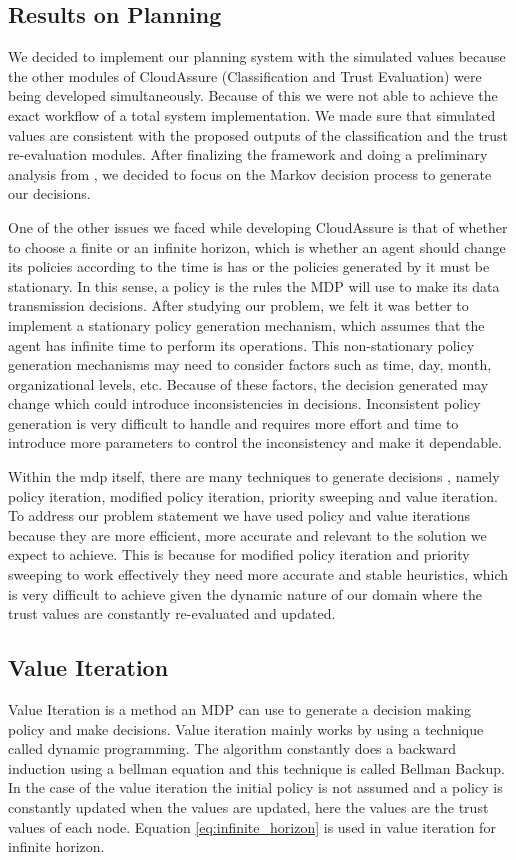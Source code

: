 \subsection{Results on Planning}
We decided to implement our planning system with the
simulated values because the other modules of CloudAssure (Classification and Trust
Evaluation) were being developed simultaneously. Because of this we were not able to
achieve the exact workflow of a total system implementation. We made sure that simulated values are consistent
with the proposed outputs of the classification and the trust re-evaluation
modules. After finalizing the framework and doing a preliminary analysis from
\autocite{Norvig2012}, we decided to focus on the Markov decision process to generate our
decisions.  

One of the other issues we faced while developing CloudAssure is that of whether to choose a finite or an infinite horizon, which is
whether an agent should change its policies according to the time is has or the
policies generated by it must be stationary. In this sense, a policy is the rules the MDP will use to make its data transmission decisions.
After studying our problem, we felt it was better to implement a stationary policy generation mechanism, which assumes
that the agent has infinite time to perform its operations. This non-stationary policy generation mechanisms may need to consider factors such as time, day, month, organizational levels,
etc. Because of these factors, the decision generated may change which could introduce inconsistencies in decisions.
Inconsistent policy generation is very difficult to handle and requires more
effort and time to introduce more parameters to control the inconsistency and
make it dependable.  

Within the \gls{mdp} itself, there are many techniques to generate decisions \autocite{Wikipedia2013}, namely policy iteration, modified policy iteration, priority sweeping
and value iteration. To address our problem statement we have used policy and
value iterations because they are more efficient, more accurate and relevant to
the solution we expect to achieve. This is because for modified policy iteration
and priority sweeping to work effectively they need more accurate and stable
heuristics, which is very difficult to achieve given the dynamic nature of our
domain where the trust values are constantly re-evaluated and updated. 

\subsection{Value Iteration}
Value Iteration is a method an MDP can use to generate a decision making policy and make decisions. Value iteration mainly works by using a technique called dynamic
programming. The algorithm constantly does a backward induction using a bellman
equation \autocite{Wikipedia2013} and this technique is called Bellman Backup. In the case of the
value iteration the initial policy is not assumed and a policy is constantly
updated when the values are updated, here the values are the trust
values of each node.  Equation \ref{eq:infinite_horizon} is used in value iteration for infinite
horizon.

